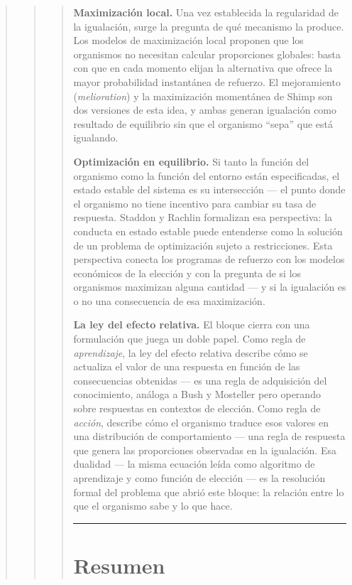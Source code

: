 \documentclass[
  letterpaper,
  DIV=11,
  numbers=noendperiod]{scrreprt}
\begin{document}
\begin{tcolorbox}[enhanced jigsaw, arc=.35mm, bottomrule=.15mm, breakable, colback=white, colframe=quarto-callout-note-color-frame, left=2mm, leftrule=.75mm, opacityback=0, rightrule=.15mm, toprule=.15mm]
\begin{quote}
\begin{quote}
\begin{quote}
\textbf{Maximización local.} Una vez establecida la regularidad de la
igualación, surge la pregunta de qué mecanismo la produce. Los modelos
de maximización local proponen que los organismos no necesitan calcular
proporciones globales: basta con que en cada momento elijan la
alternativa que ofrece la mayor probabilidad instantánea de refuerzo. El
mejoramiento (\emph{melioration}) y la maximización momentánea de Shimp
son dos versiones de esta idea, y ambas generan igualación como
resultado de equilibrio sin que el organismo ``sepa'' que está
igualando.

\textbf{Optimización en equilibrio.} Si tanto la función del organismo
como la función del entorno están especificadas, el estado estable del
sistema es su intersección --- el punto donde el organismo no tiene
incentivo para cambiar su tasa de respuesta. Staddon y Rachlin
formalizan esa perspectiva: la conducta en estado estable puede
entenderse como la solución de un problema de optimización sujeto a
restricciones. Esta perspectiva conecta los programas de refuerzo con
los modelos económicos de la elección y con la pregunta de si los
organismos maximizan alguna cantidad --- y si la igualación es o no una
consecuencia de esa maximización.

\textbf{La ley del efecto relativa.} El bloque cierra con una
formulación que juega un doble papel. Como regla de \emph{aprendizaje},
la ley del efecto relativa describe cómo se actualiza el valor de una
respuesta en función de las consecuencias obtenidas --- es una regla de
adquisición del conocimiento, análoga a Bush y Mosteller pero operando
sobre respuestas en contextos de elección. Como regla de \emph{acción},
describe cómo el organismo traduce esos valores en una distribución de
comportamiento --- una regla de respuesta que genera las proporciones
observadas en la igualación. Esa dualidad --- la misma ecuación leída
como algoritmo de aprendizaje y como función de elección --- es la
resolución formal del problema que abrió este bloque: la relación entre
lo que el organismo sabe y lo que hace.

\begin{center}\rule{0.5\linewidth}{0.5pt}\end{center}

\mbox{}%
\section{Resumen}\label{resumen-7}


\end{quote}
\end{quote}
\end{quote}
\end{tcolorbox}
\end{document}
